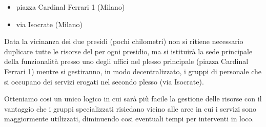 \begin{itemize}
\item{piazza Cardinal Ferrari 1 (Milano)}
\item{via Isocrate (Milano)}
\end{itemize}

Data la vicinanza dei due presidi (pochi chilometri) non si ritiene necessario duplicare tutte le risorse del  per ogni presidio, ma si istituirà la sede principale della funzionalità presso uno degli uffici nel plesso principale (piazza Cardinal Ferrari 1) mentre si gestiranno, in modo decentralizzato, i gruppi di personale che si occupano dei servizi erogati nel secondo plesso (via Isocrate).

Otteniamo cosi un unico  logico in cui sarà più facile la gestione delle risorse con il vantaggio che i gruppi specializzati risiedano vicino alle aree in cui i servizi sono maggiormente utilizzati, diminuendo cosi eventuali tempi per interventi in loco.